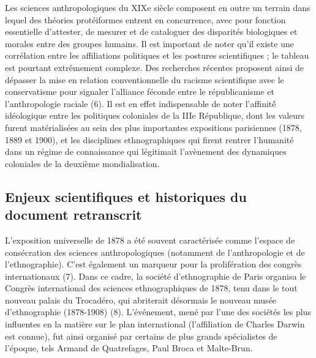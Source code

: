 \documentclass{article}
\begin{document}
	Les sciences anthropologiques du XIXe siècle composent en outre un terrain dans lequel des théories protéiformes entrent en concurrence, avec pour fonction essentielle d’attester, de mesurer et de cataloguer des disparités biologiques et morales entre des groupes humains. Il est important de noter qu’il existe une corrélation entre les affiliations politiques et les postures scientifiques ; le tableau est pourtant extrêmement complexe. Des recherches récentes proposent ainsi de dépasser la mise en relation conventionnelle du racisme scientifique avec le conservatisme pour signaler l’alliance féconde entre le républicanisme et l’anthropologie raciale (6). Il est en effet indispensable de noter l’affinité́ idéologique entre les politiques coloniales de la IIIe République, dont les valeurs furent matérialisées au sein des plus importantes expositions parisiennes (1878, 1889 et 1900), et les disciplines ethnographiques qui firent rentrer l’humanité dans un régime de connaissance qui légitimait l’avènement des dynamiques coloniales de la deuxième mondialisation.
	
	
	\subsection{Enjeux scientifiques et historiques du document retranscrit}
	
	L’exposition universelle de 1878 a été souvent caractérisée comme l’espace de consécration des sciences anthropologiques (notamment de l’anthropologie et de l’ethnographie). C’est également un marqueur pour la prolifération des congrès internationaux (7). Dans ce cadre, la société d’ethnographie de Paris organisa le Congrès international des sciences ethnographiques de 1878, tenu dans le tout nouveau palais du Trocadéro, qui abriterait désormais le nouveau musée d’ethnographie (1878-1908) (8). L’événement, mené par l’une des sociétés les plus influentes en la matière sur le plan international (l’affiliation de Charles Darwin est connue), fut ainsi organisé par certains de plus grands spécialistes de l’époque, tels Armand de Quatrefages, Paul Broca et Malte-Brun. 
	
\end{document}
